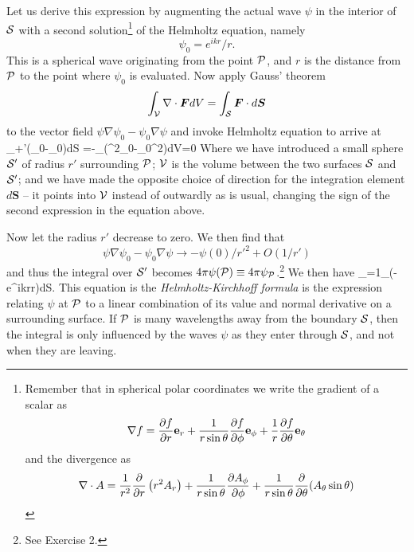 Let us derive this expression by augmenting the actual wave $\psi$ in the interior of ${\cal S}$
with a second solution\footnote{Remember that in spherical polar coordinates we
write the gradient of a scalar as 
\[
\nabla f={\partial f\over\partial r}{\bf e}_r
     +{1\over r\sin\theta}{\partial f\over\partial\phi}{\bf e}_\phi
     +{1\over r}{\partial f\over\partial\theta}{\bf e}_\theta
\] 
and the divergence as 
\[
{\nabla\cdot A}={1\over r^2}{\partial\over\partial r}\left(r^2A_r\right)
+{1\over r\sin\theta}{\partial A_\phi\over\partial\phi}
+{1\over r\sin\theta}{\partial\over\partial\theta}(A_\theta\sin\theta)
\]} of the Helmholtz equation, namely
\[
\psi_0={e^{ikr}/r}.
\]
This is a spherical wave originating from the point ${\cal P}$, and $r$ is the distance from 
${\cal P}$ to the point where $\psi_0$ is evaluated. Now apply Gauss' theorem 
\[
\int_{\cal V}\nabla\cdot{\bm F}dV=\int_{\cal S}{\bm F}\cdot d{\bm S}
\]
to the vector field $\psi\nabla\psi_0-\psi_0\nabla\psi$ and invoke Helmholtz equation to 
arrive at 
\be
\int_{+'}(\psi\nabla\psi_0-\psi_0\nabla\psi)\cdot d{\bm S}
           =-\int_(\psi\nabla^2\psi_0-\psi_0\nabla^2\psi)dV=0
\label{eq:exercise-1-eq}
\ee
Where we have introduced a small sphere ${\cal S}'$ of radius $r'$ surrounding ${\cal P}$; ${\cal V}$
is the volume between the two surfaces ${\cal S}$ and ${\cal S}'$; and we have made the opposite 
choice of direction for the integration element $d{\bm S}$ -- it points into ${\cal V}$ instead
of outwardly as is usual, changing the sign of the second expression in the equation above. 

Now let the radius $r'$ decrease to zero. We then find that 
\[
\psi\nabla\psi_0-\psi_0\nabla\psi\rightarrow {-\psi(0)/{r'}^2}+O({1/r'})
\]
and thus the integral over ${\cal S}'$ becomes $4\pi\psi({\cal P})\equiv
4\pi\psi_{\cal P}$.\footnote{See Exercise 2.} 
We then have
\be
\psi_={1\pi}\int_\left(\psi{}-{e^{ikr}\over r}\nabla\psi\right)\cdot d{\bm S}.
\label{eq:helmholtz-kirchoff}
\ee
%
This equation is the {\it Helmholtz-Kirchhoff formula} is the expression relating $\psi$ at 
${\cal P}$ to a linear combination of its value and normal derivative on a surrounding surface.
If ${\cal P}$ is many wavelengths away from the boundary ${\cal S}$, then the integral is only 
influenced by the waves $\psi$ as they enter through ${\cal S}$, and not when they are
leaving.

